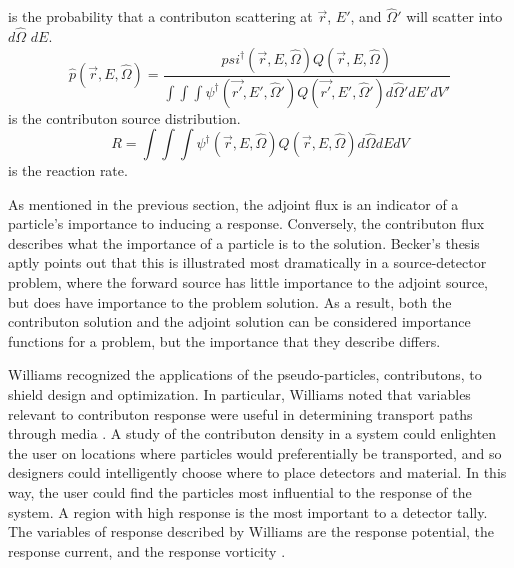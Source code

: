 is the probability that a contributon scattering at $\vec{r}$, $E'$,
and $\hat\Omega'$ will scatter into $d\hat\Omega$ $dE$.
\begin{equation}
\hat p(\vec{r}, E, \hat\Omega) =
\frac{psi^{\dagger}(\vec{r}, E, \hat\Omega) Q(\vec{r},E,\hat\Omega)}
     {\int \int \int \psi^{\dagger}(\vec{r'},E',\hat\Omega')
     Q(\vec{r'},E',\hat\Omega') d\hat\Omega' dE' dV'}
\end{equation}
is the contributon source distribution.
\begin{equation}
R = \int \int \int \psi^{\dagger}(\vec{r},E,\hat\Omega)Q(\vec{r},E,\hat\Omega)
    d\hat\Omega dE dV
\end{equation}
is the reaction rate.

As mentioned in the previous section, the adjoint flux is an indicator of a
particle's importance to inducing a response. Conversely, the contributon
flux describes what the importance of a particle is to the solution.
Becker's thesis \cite{becker_hybrid_2009} aptly points out that this is
illustrated most dramatically in a source-detector problem, where the forward
source has little importance to the adjoint source, but does have importance to
the problem solution. As a result, both the contributon solution and the adjoint
solution can be considered importance functions for a problem, but the
importance that they describe differs.

Williams recognized the applications of the pseudo-particles, contributons, to
shield design and optimization. In particular, Williams noted that variables
relevant to contributon response were useful in determining transport paths
through media \cite{williams_contributon_study, williams_SCC_shielding}. A study
of the contributon density in a system could enlighten the user on locations
where particles would preferentially be transported, and so designers could
intelligently choose where to place detectors and material. In this way, the
user could find the particles most influential to the response of the system. A
region with high response is the most important to a detector tally. The
variables of response described by Williams are the response potential, the
response current, and the response vorticity \cite{williams_contributorn_1992}.

